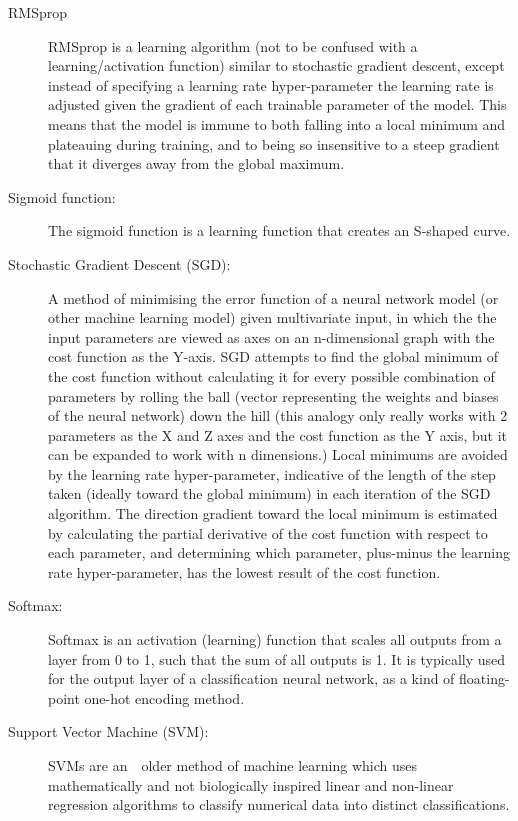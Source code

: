 \documentclass[]{report}
\begin{document}
\begin{description}
\item[RMSprop] RMSprop is a learning algorithm (not to be confused with a learning/activation function) similar to stochastic gradient descent, except instead of specifying a learning rate hyper-parameter the learning rate is adjusted given the gradient of each trainable parameter of the model. This means that the model is immune to both falling into a local minimum and plateauing during training, and to being so insensitive to a steep gradient that it diverges away from the global maximum.

\item[Sigmoid function:] The sigmoid function is a learning function that creates an S-shaped curve.

\label{itm:SGD}
\item[Stochastic Gradient Descent (SGD):] A method of minimising the error function of a neural network model (or other machine learning model) given multivariate input, in which the the input parameters are viewed as axes on an n-dimensional graph with the cost function as the Y-axis. SGD attempts to find the global minimum of the cost function without calculating it for every possible combination of parameters by rolling the ball (vector representing the weights and biases of the neural network) down the hill (this analogy only really works with 2 parameters as the X and Z axes and the cost function as the Y axis, but it can be expanded to work with n dimensions.) Local minimums are avoided by the learning rate hyper-parameter, indicative of the length of the step taken (ideally toward the global minimum) in each iteration of the SGD algorithm. The direction gradient toward the local minimum is estimated by calculating the partial derivative of the cost function with respect to each parameter, and determining which parameter, plus-minus the learning rate hyper-parameter, has the lowest result of the cost function.

\item[Softmax:] Softmax is an activation (learning) function that scales all outputs from a layer from 0 to 1, such that the sum of all outputs is 1. It is typically used for the output layer of a classification neural network, as a kind of floating-point one-hot encoding method.

\item[Support Vector Machine (SVM):] SVMs are an　older method of machine learning which uses mathematically and not biologically inspired linear and non-linear regression algorithms to classify numerical data into distinct classifications.
\end{description}
\onecolumn

\printbibliography
\end{document}
